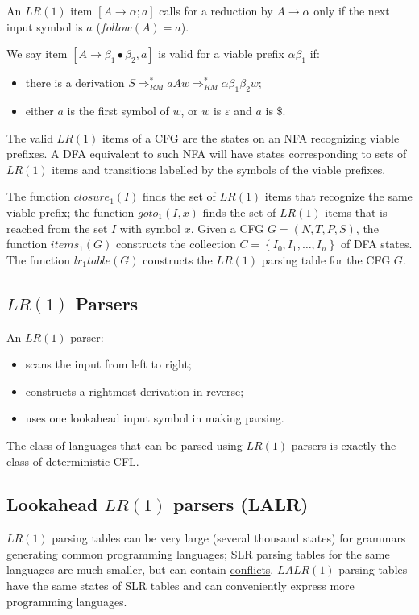 An $LR(1)$ item $[A \to \alpha; a]$ calls for a reduction by $A \to \alpha$ only if the next input symbol is $a$ ($follow(A) = a$).

We say item $[A \to \beta_1 \bullet \beta_2, a]$ is valid for a viable prefix $\alpha\beta_1$ if:
\begin{itemize}
    \item there is a derivation $S \Rightarrow^\ast_{RM} aAw \Rightarrow^\ast_{RM} \alpha\beta_1\beta_2w$;
    \item either $a$ is the first symbol of $w$, or $w$ is $\varepsilon$ and $a$ is $\$$.
\end{itemize}
The valid $LR(1)$ items of a CFG are the states on an NFA recognizing viable prefixes.
A DFA equivalent to such NFA will have states corresponding to sets of $LR(1)$ items and transitions labelled by the symbols of the viable prefixes.

The function $closure_1(I)$ finds the set of $LR(1)$ items that recognize the same viable prefix; the function $goto_1(I, x)$ finds the set of $LR(1)$ items that is reached from the set $I$ with symbol $x$.
Given a CFG $G = (N, T, P, S)$, the function $items_1(G)$ constructs the collection $C = \left\{I_0, I_1, \ldots, I_n\right\}$ of DFA states.
The function $lr_1table(G)$ constructs the $LR(1)$ parsing table for the CFG $G$.

\subsection{$LR(1)$ Parsers}
An $LR(1)$ parser:
\begin{itemize}
    \item scans the input from left to right;
    \item constructs a rightmost derivation in reverse;
    \item uses one lookahead input symbol in making parsing.
\end{itemize}
The class of languages that can be parsed using $LR(1)$ parsers is exactly the class of deterministic CFL.

\subsection{Lookahead $LR(1)$ parsers (LALR)}
$LR(1)$ parsing tables can be very large (several thousand states) for grammars generating common programming languages; SLR parsing tables for the same languages are much smaller, but can contain \underline{conflicts}.
$LALR(1)$ parsing tables have the same states of SLR tables and can conveniently express more programming languages.

